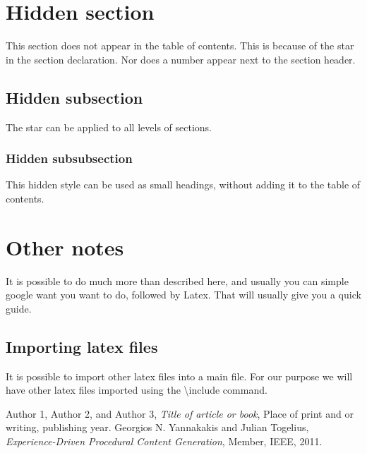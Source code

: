\documentclass[a4paper,11pt]{article}
\begin{document}
\section*{Hidden section}
This section does not appear in the table of contents. This is because of the star in the section declaration. Nor does a number appear next to the section header.
\subsection*{Hidden subsection}
The star can be applied to all levels of sections.
\subsubsection*{Hidden subsubsection}
This hidden style can be used as small headings, without adding it to the table of contents.

\section{Other notes}
It is possible to do much more than described here, and usually you can simple google want you want to do, followed by Latex. That will usually give you a quick guide.
\subsection{Importing latex files}
It is possible to import other latex files into a main file. For our purpose we will have other latex files imported using the \textbackslash include command.


\begin{thebibliography}{1}

Author 1, Author 2, and Author 3, \emph{Title of article or book}, Place of print and or writing, publishing year.
Georgios N. Yannakakis and Julian Togelius, \emph{Experience-Driven Procedural Content Generation}, Member, IEEE, 2011.
\end{thebibliography}
\end{document}
